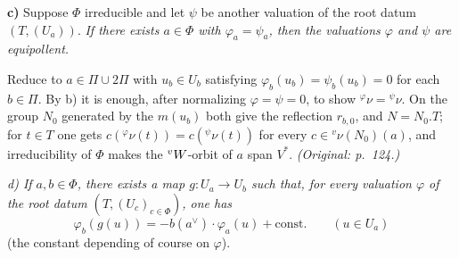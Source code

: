 \documentclass[12pt,a4paper,oneside,english]{smfart}
\makeatletter
\newcommand{\btpageanchor}[1]{\Hy@raisedlink{\hypertarget{p:#1}{}}}
\newcommand{\btpage}[1]{\marginnote{p.~#1}\btpageanchor{#1}}
\newcommand{\pmark}[1]{\btpage{#1}}
\theoremstyle{definition}
\theoremstyle{bt}
\makeatother
\begin{document}
\medskip
\noindent\textbf{c)} Suppose $\Phi$ irreducible and let $\psi$ be another
valuation of the root datum $(T,(U_a))$. \emph{If there exists $a\in\Phi$ with
$\varphi_a=\psi_a$, then the valuations $\varphi$ and $\psi$ are equipollent.}

\begin{sketch}
Reduce to $a\in\Pi\cup2\Pi$ with $u_b\in U_b$ satisfying
$\varphi_b(u_b)=\psi_b(u_b)=0$ for each $b\in\Pi$. By b) it is enough, after
normalizing $\varphi=\psi=0$, to show ${}^{\varphi}\nu={}^{\psi}\nu$. On the
group $N_0$ generated by the $m(u_b)$ both give the reflection $r_{b,0}$, and
$N=N_0.T$; for $t\in T$ one gets $c({}^{\varphi}\nu(t))=c({}^{\psi}\nu(t))$ for
every $c\in{}^{v}\nu(N_0)(a)$, and irreducibility of $\Phi$ makes the $\vW$-orbit
of $a$ span $V^{*}$. \emph{(Original: p.~124.)}
\end{sketch}
\par\endgroup

\begingroup\providecommand{\R}{}
\renewcommand{\R}{\mathbf{R}}
\providecommand{\Z}{}
\renewcommand{\Z}{\mathbf{Z}}
\providecommand{\N}{}
\renewcommand{\N}{\mathbf{N}}
\providecommand{\Rt}{}
\renewcommand{\Rt}{\widetilde{\R}}
\providecommand{\Gt}{}
\renewcommand{\Gt}{\widetilde{\Gamma}}
\providecommand{\co}{}
\renewcommand{\co}{^{\vee}}
\providecommand{\vW}{}
\renewcommand{\vW}{{}^{v}W}
\providecommand{\vnu}{}
\renewcommand{\vnu}{{}^{v}\nu}
\providecommand{\vSi}{}
\renewcommand{\vSi}{{}^{v}\Sigma}
\providecommand{\red}{}
\renewcommand{\red}{\mathrm{red}}
\providecommand{\nm}{}
\renewcommand{\nm}{\mathrm{nm}}
\providecommand{\Phired}{}
\renewcommand{\Phired}{\Phi^{\red}}
\providecommand{\Phinm}{}
\renewcommand{\Phinm}{\Phi^{\nm}}
\providecommand{\Ech}{}
\renewcommand{\Ech}{\mathscr{E}}
\providecommand{\Gscr}{}
\renewcommand{\Gscr}{\mathscr{G}}
\providecommand{\Fscr}{}
\renewcommand{\Fscr}{\mathscr{F}}
\providecommand{\Inf}{}
\renewcommand{\Inf}{\operatorname{Inf}}
\providecommand{\Hom}{}
\renewcommand{\Hom}{\operatorname{Hom}}
\providecommand{\cte}{}
\renewcommand{\cte}{\mathrm{const.}}
\providecommand{\para}{}
\renewcommand{\para}[1]{\medskip\noindent\textbf{(#1)}\ \ignorespaces}
\setlength{\parindent}{1.5em}
\bigskip

\pmark{125}
\noindent
\textit{d) If $a,b\in\Phi$, there exists a map $g:U_a\to U_b$ such that,
for every valuation $\varphi$ of the root datum $(T,(U_c)_{c\in\Phi})$, one
has}
\[
  \varphi_b(g(u))=-b(a\co)\cdot\varphi_a(u)+\cte
  \qquad(u\in U_a)
\]
(the constant depending of course on $\varphi$).
\end{document}
